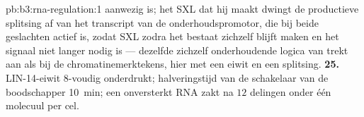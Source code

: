 \begin{solution}{pb:b3:rna-regulation:1}
aanwezig is; het SXL dat hij maakt dwingt de productieve splitsing af
van het transcript van de onderhoudspromotor, die bij beide geslachten
actief is, zodat SXL zodra het bestaat zichzelf blijft maken en het
signaal niet langer nodig is --- dezelfde zichzelf onderhoudende logica
van  trekt  aan als bij de chromatinemerktekens, hier met
een eiwit en een splitsing.
\textbf{25.} LIN-14-eiwit $8$-voudig onderdrukt; halveringstijd van de
schakelaar van de boodschapper \qty{10}{min}; een onversterkt RNA zakt
na $12$ delingen onder één molecuul per cel.
\end{solution}
